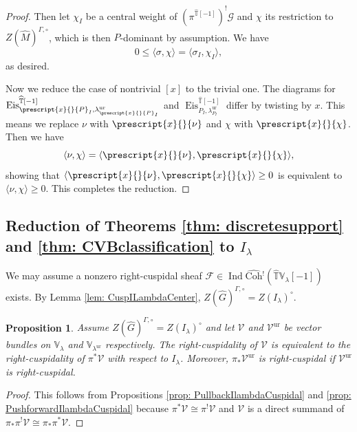\documentclass{amsart}
\newtheorem{proposition}[theorem]{Proposition}
\theoremstyle{definition}
\theoremstyle{remark}
\numberwithin{equation}{section}
\DeclareMathOperator{\Ind}{Ind}
\newcommand{\mc}{\mathcal}
\newcommand{\co}[1]{\prescript{#1}{}}
\newcommand{\wh}{\widehat}
\DeclareMathOperator{\Eis}{\mathrm{Eis}}
\newcommand{\Coh}{\mathrm{Coh}}
\newcommand{\ur}{\mathrm{ur}}
\newcommand{\V}{\mathbb{V}}
\newcommand{\T}{\mathbb{T}}
\begin{document}
\begin{proof}
Then let $\chi_I$ be a central weight of $(\pi^{\wh{\T}[-1]})^! \mc G$ and $\chi$ its restriction to $Z(\wh{M})^{\Gamma, \circ}$, which is then $P$-dominant by assumption. We have 
\begin{equation*}
    0  \leq \langle \sigma, \chi \rangle = \langle \sigma_I , \chi_I \rangle,
\end{equation*}
as desired.

 Now we reduce the case of nontrivial $[x]$ to the trivial one. The diagrams for $\Eis^{\wh{\T}[-1]}_{\co{x}{P}_I, \lambda^\ur_{\co{x}{P}_I}}$ and $\Eis^{\wh{\T}[-1]}_{P_I, \lambda^\ur_{P_I}}$ differ by twisting by $x$. This means we replace $\nu$ with $\co{x}{\nu}$ and $\chi$ with $\co{x}{\chi}$. Then we have
 \begin{equation*}
     \langle \nu, \chi \rangle = \langle \co{x}{\nu}, \co{x}{\chi} \rangle,
 \end{equation*}
 showing that $\langle \co{x}{\nu}, \co{x}{\chi} \rangle \geq 0$ is equivalent to $\langle \nu, \chi \rangle \geq 0$. This completes the reduction.
\end{proof}
\subsection{Reduction of Theorems \ref{thm: discretesupport} and \ref{thm: CVBclassification} to $I_\lambda$}{\label{ss: reductiondiscsuppcvbclassgraded}}

We may assume a nonzero right-cuspidal sheaf $\mc F\in \Ind\wh{\Coh}{}^! (\wh{\T}\V_\lambda[-1])$ exists. By Lemma \ref{lem: CuspILambdaCenter}, $Z(\wh{G})^{\Gamma, \circ} = Z(I_{\lambda})^{\circ}$. 

\begin{proposition}{\label{prop: cuspurpushpull}}
Assume $Z(\wh{G})^{\Gamma, \circ} = Z(I_{\lambda})^{\circ}$ and let $\mc V$ and $\mc{V}^{\ur}$ be vector bundles on $\V_\lambda$ and $\V_{\lambda^{\ur}}$ respectively. The right-cuspidality of $\mc V$ is equivalent to the right-cuspidality of $\pi^* \mc V$ with respect to $I_\lambda$. Moreover, $\pi_* \mc V^\ur$ is right-cuspidal if $\mc V^\ur$ is right-cuspidal. 
\end{proposition}

\begin{proof}
This follows from Propositions \ref{prop: PullbackIlambdaCuspidal} and \ref{prop: PushforwardIlambdaCuspidal} because $\pi^* \mc V\cong \pi^! \mc V$ and $\mc V$ is a direct summand of $\pi_* \pi^! \mc V\cong \pi_* \pi^* \mc V$.       
\end{proof}
\end{document}
